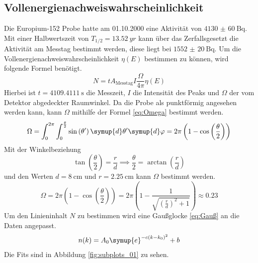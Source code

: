 \subsection{Vollenergienachweiswahrscheinlichkeit}
\label{cap:Vollenergienachweiswahrscheinlichkeit}
Die Europium-152 Probe hatte am 01.10.2000 eine Aktivität von $\SI{4130(60)}{\becquerel}$. Mit einer 
Halbwertszeit von $T_{1/2} = \SI{13.52}{yr}$ kann über das Zerfallsgesetzt die Aktivität 
am Messtag bestimmt werden, diese liegt bei $\SI{1552(20)}{\becquerel}$.
Um die Vollenergienachweiswahrscheinlichkeit $\eta(E)$ bestimmen zu können, wird folgende Formel benötigt.
\begin{equation}
  \label{eq:eta_N}
  N = tA_{\text{Messtag}}I\frac{\Omega}{4\pi}\eta(E)
\end{equation}
Hierbei ist $t=\SI{4109.4111}{\second}$ die Messzeit, $I$ die Intensität  des Peaks und $\Omega$ der vom Detektor abgedeckter
Raumwinkel.
Da die Probe als punktförmig angesehen werden kann, kann $\Omega$ mithilfe der Formel \eqref{eq:Omega} bestimmt werden.
\begin{equation}
  \label{eq:Omega}
  \Omega = \int_{0}^{2\pi}\int_{0}^{\frac{\theta}{2}} \sin\left(\theta'\right)\symup{d}\theta'\symup{d}\varphi = 
  2\pi \left(1-\cos\left(\frac{\theta}{2}\right)\right)
\end{equation}
Mit der Winkelbeziehung 
\begin{equation*}
  \tan\left(\frac{\theta}{2}\right) = \frac{r}{d} \implies \frac{\theta}{2} = \arctan\left(\frac{r}{d}\right)
\end{equation*}
und den Werten $d = \SI{8}{\centi\meter}$ und $r = \SI{2.25}{\centi\meter}$ kann $\Omega$ bestimmt werden.
\begin{equation*}
  \Omega = 2\pi \left(1-\cos\left(\frac{\theta}{2}\right)\right) = 2\pi\left(1- \frac{1}{\sqrt{\left(\frac{r}{d}\right)^2+1}}\right) \approx \num{0.23}
\end{equation*}
Um den Linieninhalt $N$ zu bestimmen wird eine Gaußglocke \eqref{eq:Gauß} an die Daten angepasst.
\begin{equation}
  \label{eq:Gauß}
  n(k)= A_0 \symup{e}^{-c(k-k_0)^2} + b
\end{equation}
Die Fits sind in Abbildung \ref{fig:subplots_01} zu sehen.
\FloatBarrier

